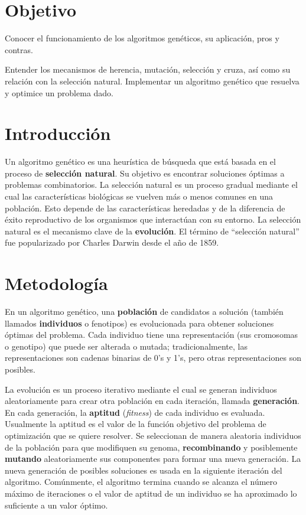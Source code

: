 

\section{Objetivo}
Conocer el funcionamiento de los algoritmos genéticos, su aplicación, pros y contras.\par
Entender los mecanismos de herencia, mutación, selección y cruza, así como su relación con la selección natural.
Implementar un algoritmo genético que resuelva y optimice un problema dado.

\section{Introducci\'on}

Un algoritmo genético es una heurística de búsqueda que está basada en el proceso de \textbf{selección natural}.  Su objetivo es encontrar soluciones óptimas a problemas combinatorios. La selección natural es un proceso gradual mediante el cual las características biológicas se vuelven más o menos comunes en una población. Esto depende de las características heredadas y de la diferencia de éxito reproductivo de los organismos que interactúan con su entorno. La selección natural es el mecanismo clave de la \textbf{evolución}. El término de “selección natural” fue popularizado por Charles Darwin desde el año de 1859.

\section{Metodolog\'ia}

En un algoritmo genético, una \textbf{población} de candidatos a solución (también llamados \textbf{individuos} o fenotipos) es evolucionada para obtener soluciones óptimas del problema. Cada individuo tiene una representación (sus cromosomas o genotipo) que puede ser alterada o mutada; tradicionalmente, las representaciones son cadenas binarias de 0’s y 1’s, pero otras representaciones son posibles.\par

La evolución es un proceso iterativo mediante el cual se generan individuos aleatoriamente para crear otra población en cada iteración, llamada \textbf{generación}. En cada generación, la \textbf{aptitud} (\textit{fitness}) de cada individuo es evaluada. Usualmente la aptitud es el valor de la función objetivo del problema de optimización que se quiere resolver. Se seleccionan de manera aleatoria individuos de la población para que modifiquen su genoma, \textbf{recombinando} y posiblemente \textbf{mutando} aleatoriamente sus componentes para formar una nueva generación. La nueva generación de posibles soluciones es usada en la siguiente iteración del algoritmo. Comúnmente, el algoritmo termina cuando se alcanza el número máximo de iteraciones o el valor de aptitud de un individuo se ha aproximado lo suficiente a un valor óptimo.

